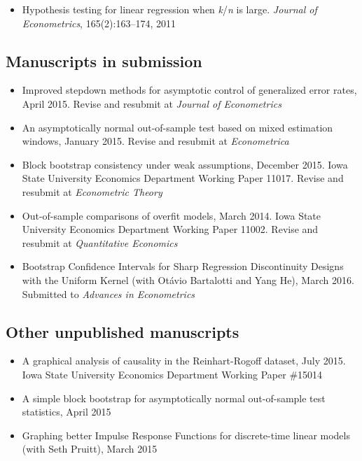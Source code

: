 \documentclass[12pt]{article}%
\begin{document}
\begin{itemize}
\item Hypothesis testing for linear regression when
\textit{k}/\textit{n} is large. \textit{Journal of Econometrics},
165(2):163--174, 2011
\end{itemize}

\subsection*{Manuscripts in submission}

\begin{itemize}
\item Improved stepdown methods for asymptotic control of generalized
error rates, April 2015. Revise and resubmit at \textit{Journal of
Econometrics}
\item An asymptotically normal out-of-sample test based on mixed
estimation windows, January 2015. Revise and resubmit at
\textit{Econometrica}
\item Block bootstrap consistency under weak assumptions, December
2015.  Iowa State University Economics Department Working Paper
11017. Revise and resubmit at \textit{Econometric Theory}
\item Out-of-sample comparisons of overfit models, March 2014. Iowa
State University Economics Department Working Paper 11002. Revise and
resubmit at \textit{Quantitative Economics}
\item Bootstrap Confidence Intervals for Sharp Regression
Discontinuity Designs with the Uniform Kernel (with Ot\'avio Bartalotti
and Yang He), March 2016. Submitted to \textit{Advances in Econometrics}
\end{itemize}

\subsection*{Other unpublished manuscripts}
\begin{itemize}
\item A graphical analysis of causality in the Reinhart-Rogoff
dataset, July 2015. Iowa State University Economics Department Working
Paper \#15014
\item A simple block bootstrap for asymptotically normal out-of-sample
test statistics, April 2015
\item Graphing better Impulse Response Functions for discrete-time
linear models (with Seth Pruitt), March 2015
\end{itemize}
\end{document}
